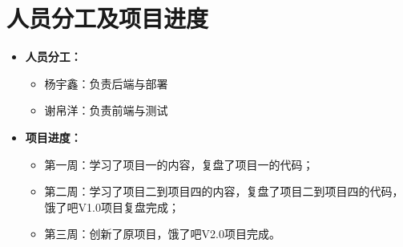 
\chapter{人员分工及项目进度}

\begin{itemize}
  \item \textbf{人员分工：}
  \begin{itemize}
      \item 杨宇鑫：负责后端与部署
      \item 谢帛洋：负责前端与测试
  \end{itemize}
\end{itemize}

\begin{itemize}
\item \textbf{项目进度：}
\begin{itemize}
    \item 第一周：学习了项目一的内容，复盘了项目一的代码；
    \item 第二周：学习了项目二到项目四的内容，复盘了项目二到项目四的代码，饿了吧V1.0项目复盘完成；
    \item 第三周：创新了原项目，饿了吧V2.0项目完成。
\end{itemize}
\end{itemize}
